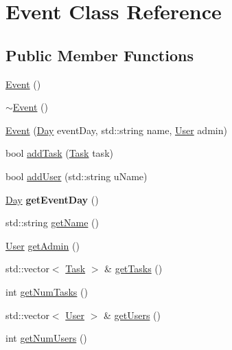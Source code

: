 \hypertarget{class_event}{}\section{Event Class Reference}
\label{class_event}
\subsection*{Public Member Functions}
\begin{DoxyCompactItemize}
\item 
\mbox{\hyperlink{class_event_a5a40dd4708297f7031e29b39e039ae10}{Event}} ()
\item 
\mbox{\hyperlink{class_event_a7704ec01ce91e673885792054214b3d2}{$\sim$\+Event}} ()
\item 
\mbox{\hyperlink{class_event_a7ce079bddd0e846a77933ba8d061e6a3}{Event}} (\mbox{\hyperlink{class_day}{Day}} event\+Day, std\+::string name, \mbox{\hyperlink{class_user}{User}} admin)
\item 
bool \mbox{\hyperlink{class_event_a919b26c4329be742b3effe58aa30ab02}{add\+Task}} (\mbox{\hyperlink{class_task}{Task}} task)
\item 
bool \mbox{\hyperlink{class_event_ab1df9a3359b6c36e5b20fe2427815301}{add\+User}} (std\+::string u\+Name)
\item 
\mbox{\label{class_event_a68b230ed9891e612526b5743d1b3e12b}} 
\mbox{\hyperlink{class_day}{Day}} {\bfseries get\+Event\+Day} ()
\item 
std\+::string \mbox{\hyperlink{class_event_adf0f3e50061123d6f24200661eeb66eb}{get\+Name}} ()
\item 
\mbox{\hyperlink{class_user}{User}} \mbox{\hyperlink{class_event_adabdcb711ca198d3fe079986f218b1cc}{get\+Admin}} ()
\item 
std\+::vector$<$ \mbox{\hyperlink{class_task}{Task}} $>$ \& \mbox{\hyperlink{class_event_a91a803183d3ab50bc824c445ef0824b5}{get\+Tasks}} ()
\item 
int \mbox{\hyperlink{class_event_a3e2c6782aa72b2c0663a499d23c57f12}{get\+Num\+Tasks}} ()
\item 
std\+::vector$<$ \mbox{\hyperlink{class_user}{User}} $>$ \& \mbox{\hyperlink{class_event_a254ee56527f75c441b5eee8c078f3c04}{get\+Users}} ()
\item 
int \mbox{\hyperlink{class_event_a4b5a29e8ea8ff1199e31cf7d3cf1301b}{get\+Num\+Users}} ()
\item 
\mbox{\label{class_event_a02b714b10375e6adfdab538992b29cca}} 

\end{DoxyCompactItemize}
